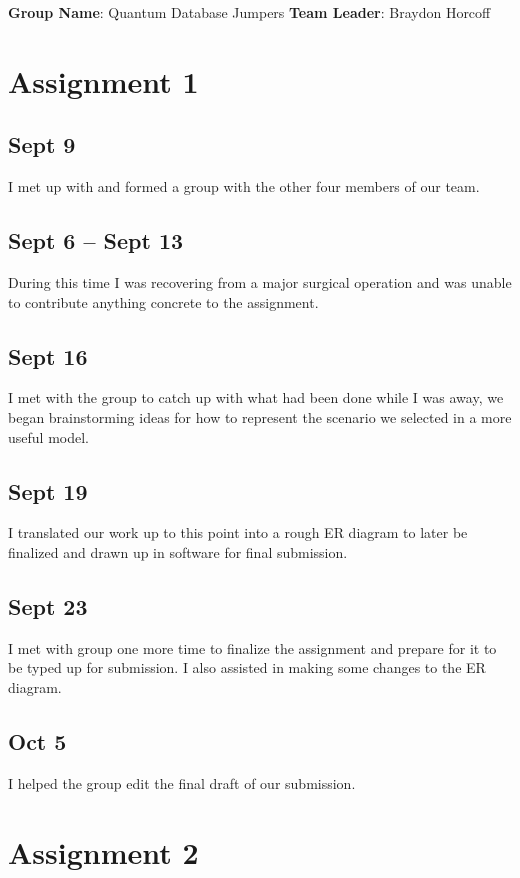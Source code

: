 \documentclass[11pt]{article}
\begin{document}
\noindent
\textbf{Group Name}: Quantum Database Jumpers
\newline
\textbf{Team Leader}: Braydon Horcoff


\section*{Assignment 1}
\subsection*{Sept 9}
I met up with and formed a group with the other four members of our team.


\subsection*{Sept 6 -- Sept 13}
During this time I was recovering from a major surgical operation and was
unable to contribute anything concrete to the assignment.


\subsection*{Sept 16}
I met with the group to catch up with what had been done while I was away,
we began brainstorming ideas for how to represent the scenario we selected in a
more useful model.


\subsection*{Sept 19}
I translated our work up to this point into a rough ER diagram to later be
finalized and drawn up in software for final submission.


\subsection*{Sept 23}
I met with group one more time to finalize the assignment and prepare for it to
be typed up for submission. I also assisted in making some changes to the ER
diagram.


\subsection*{Oct 5}
I helped the group edit the final draft of our submission.


\section*{Assignment 2}
\end{document}
